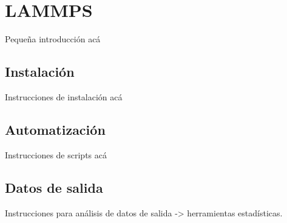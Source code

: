
\chapter{LAMMPS} %

\label{AA} %


Pequeña introducción acá

\section{Instalación}
\label{AA_1}

Instrucciones de instalación acá

\section{Automatización}
\label{AA_2}

Instrucciones de scripts acá

\section{Datos de salida}
\label{AA_3}

Instrucciones para análisis de datos de salida -> herramientas estadísticas.
